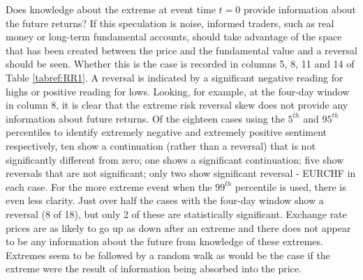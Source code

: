 \documentclass[preprint,12pt,authoryear]{elsarticle}
\begin{document}
Does knowledge about the extreme at event time $t = 0$ provide information about the future returns?  If this speculation is noise, informed traders, such as real money or long-term fundamental accounts, should take advantage of the space that has been created between the price and the fundamental value and a reversal should be seen.  Whether this is the case is recorded in columns 5, 8, 11 and 14 of Table \ref{tabref:RR1}. A reversal is indicated by a significant negative reading for highs or positive reading for lows.   Looking, for example, at the four-day window in column 8, it is clear that the extreme risk reversal skew does not provide any information about future returns.  Of the eighteen cases using the $5^{th}$ and $95^{th}$ percentiles to identify extremely negative and extremely positive sentiment respectively, ten show a continuation (rather than a reversal) that is not significantly different from zero; one shows a significant continuation; five show reversals that are not significant; only two show significant reversal - EURCHF in each case.  For the more extreme event when the $99^{th}$ percentile is used, there is even less clarity.  Just over half the cases with the four-day window show a reversal (8 of 18), but only 2 of these are statistically significant. Exchange rate prices are as likely to go up as down after an extreme and there does not appear to be any information about the future from knowledge of these extremes. Extremes seem to be followed by a random walk as would be the case if the extreme were the result of information being absorbed into the price.  
\end{document}

